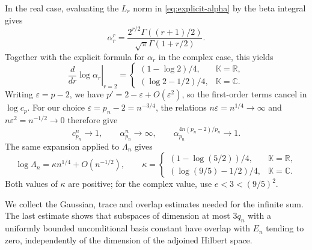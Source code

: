 \documentclass[11pt,a4paper,reqno]{amsart}
\theoremstyle{definition}
\newcommand{\R}{\mathbb R}
\newcommand{\C}{\mathbb C}
\newcommand{\eps}{\varepsilon}
\numberwithin{equation}{section}
\begin{document}
In the real case, evaluating the $L_r$ norm in \eqref{eq:explicit-alpha} by the beta integral gives
\begin{equation*}
 \alpha_r^r=\frac{2^{r/2}\Gamma((r+1)/2)}
                   {\sqrt\pi\Gamma(1+r/2)}.
\end{equation*}
Together with the explicit formula for $\alpha_r$ in the complex case, this yields
\begin{equation*}
 \left.\frac{d}{dr}\log\alpha_r\right|_{r=2}
 =\begin{cases}
 (1-\log2)/4,&\mathbb K=\R,\\
 (\log2-1/2)/4,&\mathbb K=\C.
 \end{cases}
\end{equation*}
Writing $\eps=p-2$, we have $p'=2-\eps+O(\eps^2)$, so the first-order terms cancel in $\log c_p$. For our choice $\eps=p_n-2=n^{-3/4}$, the relations $n\eps=n^{1/4}\to\infty$ and $n\eps^2=n^{-1/2}\to0$ therefore give
\begin{equation}\label{eq:parameter-limits}
 c_{p_n}^n\longrightarrow1,\qquad
 \alpha_{p_n}^n\longrightarrow\infty,\qquad
 \alpha_{p_n}^{4n(p_n-2)/p_n}\longrightarrow1.
\end{equation}
The same expansion applied to $\Lambda_n$ gives
\begin{equation}\label{eq:positive-exponent}
 \log\Lambda_n=\kappa n^{1/4}+O(n^{-1/2}),\qquad
 \kappa=
 \begin{cases}
 (1-\log(5/2))/4,&\mathbb K=\R,\\
 (\log(9/5)-1/2)/4,&\mathbb K=\C.
 \end{cases}
\end{equation}
Both values of $\kappa$ are positive; for the complex value, use $e<3<(9/5)^2$.

We collect the Gaussian, trace and overlap estimates needed for the infinite sum. The last estimate shows that subspaces of dimension at most $3q_n$ with a uniformly bounded unconditional basis constant have overlap with $E_n$ tending to zero, independently of the dimension of the adjoined Hilbert space.
\end{document}
